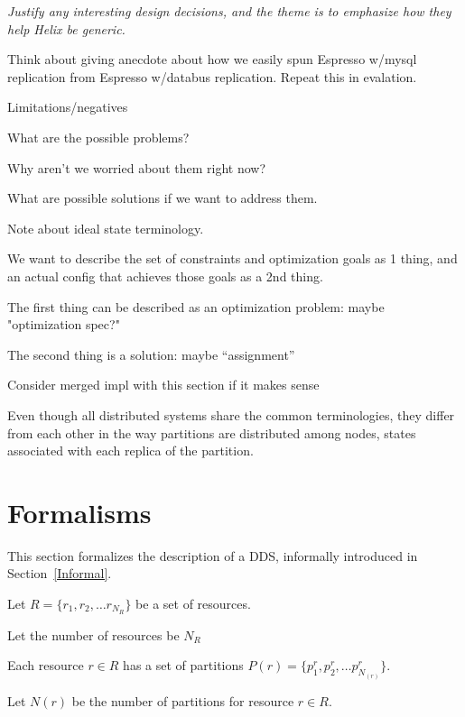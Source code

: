 {\em 
Justify any interesting design decisions, and the theme is to
emphasize how they help Helix be generic.

Think about giving anecdote about how we easily spun Espresso w/mysql
replication from Espresso w/databus replication.  Repeat this in
evalation.

Limitations/negatives
\bi
\item What are the possible problems?
\item Why aren't we worried about them right now?
\item What are possible solutions if we want to address them.
\ei


Note about ideal state terminology.
\bi
\item 
We want to describe the set of constraints and
optimization goals as 1 thing, and an actual
config that achieves those goals as a 2nd
thing.
\item The first thing can be described as an
optimization problem: maybe "optimization
spec?"
\item The second thing is a solution: maybe
``assignment''
\ei


Consider merged impl with this section if it makes sense


Even though all distributed systems share the common terminologies,
they differ from each other in the way partitions are distributed
among nodes, states associated with each replica of the partition.
}

\section{Formalisms}

This section formalizes the description of a DDS, informally introduced
in Section~\ref{Informal}.

\begin{definition}
Let \(R = \{r_1, r_2, \ldots r_{N_R}\}\) be a set of resources. 
\end{definition}

\begin{definition}
Let the number of resources be \(N_R\)
\end{definition}

\begin{definition}
Each resource \(r \in R\) has a set of partitions
\(P(r) = \{p^r_1, p^r_2, \ldots p^r_{N_(r)}\}\).
\end{definition}

\begin{definition}
Let \(N(r)\) be the number of partitions for resource \(r \in R\). 
\end{definition}

